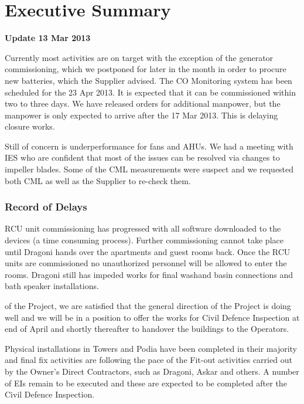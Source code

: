 

\makeatletter
\newenvironment{update}{\quotation}{\endquotation}
\makeatother
\chapter{Executive Summary}

\begin{update}
\noindent\centerline{\textbf{Update 13 Mar 2013}}

Currently most activities are on target with the exception of the generator commissioning, which we postponed for later in the month in order to procure new batteries, which the Supplier advised. The
CO Monitoring system has been scheduled for the 23 Apr 2013. It is expected that it can be
commissioned within two to three days. We have released orders for additional manpower, but
the manpower is only expected to arrive after the 17 Mar 2013. This is delaying closure works.

Still of concern is underperformance for fans and AHUs. We had a meeting with IES who are confident
that most of the issues can be resolved via changes to impeller blades. Some of the CML measurements
were suspect and we requested both CML as well as the Supplier to re-check them.

\subsection*{Record of Delays}
RCU unit commissioning has progressed with all software downloaded to the devices (a time consuming process). Further commissioning cannot take place until Dragoni hands over the apartments and guest rooms back. Once the RCU units are commissioned no unauthorized personnel will be allowed to enter the rooms. Dragoni still has impeded works for final washand basin connections and bath speaker installations.


\end{update}

 of the Project, we are satisfied that the general direction of the Project is doing well and we will be in a position to offer the works for Civil Defence Inspection at end of April and shortly thereafter to  handover the buildings to the Operators. 

Physical installations in Towers and Podia have been completed in their majority and final fix activities are following the pace of the Fit-out activities carried out by the Owner's Direct Contractors, such as Dragoni, Askar and others.  A number of EIs remain to be executed and these are
expected to be completed after the Civil Defence Inspection.

